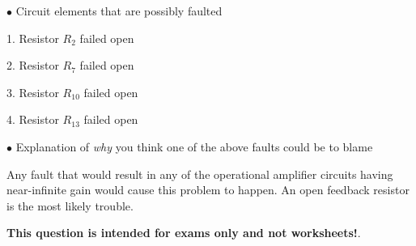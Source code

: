 \medskip
\goodbreak
\item{$\bullet$} Circuit elements that are possibly faulted
\item{1.} Resistor $R_2$ failed open
\item{2.} Resistor $R_7$ failed open
\item{3.} Resistor $R_{10}$ failed open
\item{4.} Resistor $R_{13}$ failed open
\medskip

\medskip
\goodbreak
\item{$\bullet$} Explanation of {\it why} you think one of the above faults could be to blame
\medskip

Any fault that would result in any of the operational amplifier circuits having near-infinite gain would cause this problem to happen.  An open feedback resistor is the most likely trouble.







{\bf This question is intended for exams only and not worksheets!}.



